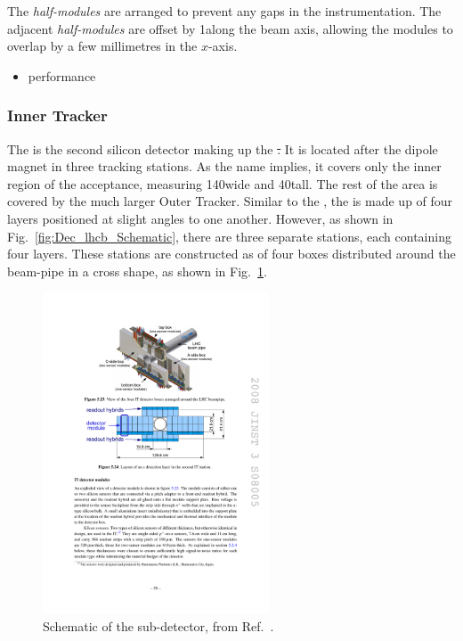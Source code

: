 The \emph{half-modules} are arranged to prevent any gaps in the instrumentation. The adjacent \emph{half-modules} are offset by 1\cm along the beam axis, allowing the modules to overlap by a few millimetres in the $x$-axis. 


{\color{Red}
\begin{itemize}
\item performance
\end{itemize}
}


\subsubsection{Inner Tracker}

The \intr is the second silicon detector making up the \st. It is located after the dipole magnet in three tracking stations. As the name implies, it covers only the inner region of the acceptance, measuring 140\cm wide and 40\cm tall. The rest of the area is covered by the much larger Outer Tracker. Similar to the \ttracker, the \intr is made up of four layers positioned at slight angles to one another. However, as shown in Fig.~\ref{fig:Dec_lhcb_Schematic}, there are three separate \intr stations, each containing four layers.
These stations are constructed as of four boxes distributed around the beam-pipe in a cross shape, as shown in Fig.~\ref{fig:Dec_it_layout}. 

\begin{figure}[!h]
    \centering
    \includegraphics[width=0.6\textwidth]{figs/Detector/it_layout.pdf}
    \caption{Schematic of the \intr sub-detector, from Ref.~\cite{Alves:2008zz}.}
    \label{fig:Dec_it_layout}   
\end{figure}

